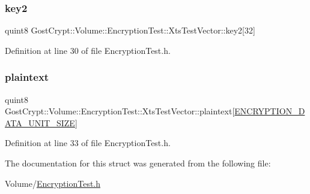 \subsubsection{\texorpdfstring{key2}{key2}}
{\footnotesize\ttfamily quint8 Gost\+Crypt\+::\+Volume\+::\+Encryption\+Test\+::\+Xts\+Test\+Vector\+::key2\mbox{[}32\mbox{]}}



Definition at line 30 of file Encryption\+Test.\+h.

\mbox{\label{struct_gost_crypt_1_1_volume_1_1_encryption_test_1_1_xts_test_vector_af4c474f8c6dccd04030d2f74ac5f8d83}} 
\subsubsection{\texorpdfstring{plaintext}{plaintext}}
{\footnotesize\ttfamily quint8 Gost\+Crypt\+::\+Volume\+::\+Encryption\+Test\+::\+Xts\+Test\+Vector\+::plaintext\mbox{[}\hyperlink{_crypto_8h_a7339cf855afd6ec7616a26b99738e2ed}{E\+N\+C\+R\+Y\+P\+T\+I\+O\+N\+\_\+\+D\+A\+T\+A\+\_\+\+U\+N\+I\+T\+\_\+\+S\+I\+ZE}\mbox{]}}



Definition at line 33 of file Encryption\+Test.\+h.



The documentation for this struct was generated from the following file\+:\begin{DoxyCompactItemize}
\item 
Volume/\hyperlink{_encryption_test_8h}{Encryption\+Test.\+h}\end{DoxyCompactItemize}
